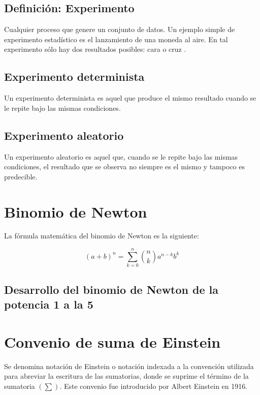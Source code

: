 \documentclass{article}
\begin{document}
\subsection{Definici\'on: Experimento}

Cualquier proceso que genere un conjunto de datos. Un ejemplo simple de
experimento estad\'istico es el lanzamiento de una moneda al aire. En tal
experimento s\'olo hay dos resultados posibles: cara o cruz
\cite{walpole2012probabilidad}.

\subsection{Experimento determinista}
Un experimento determinista es aquel que produce el mismo resultado cuando se le
repite bajo las mismas condiciones.

\subsection{Experimento aleatorio}
Un experimento aleatorio es aquel que, cuando se le repite bajo las mismas
condiciones, el resultado que se observa no siempre es el mismo y tampoco es
predecible.

\section{Binomio de Newton}

La fórmula matemática del binomio de Newton es la siguiente:

\begin{equation}
    (a+b)^n = \sum_{k=0}^{n} \binom{n}{k} a^{n-k} b^k
\end{equation}

\subsection{Desarrollo del binomio de Newton de la potencia 1 a la 5}





\section{Convenio de suma de Einstein}

Se denomina notación de Einstein o notación indexada a la convención utilizada
para abreviar la escritura de las sumatorias, donde se suprime el término de la
sumatoria $(\sum)$. Este convenio fue introducido por Albert Einstein en 1916.
\end{document}
